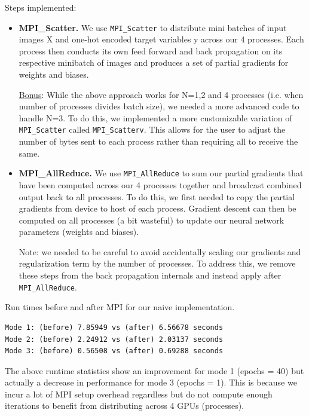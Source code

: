 \documentclass[12pt,letterpaper,twoside]{article}
\begin{document}
Steps implemented:
\begin{itemize}
    \item \textbf{MPI\_Scatter.} We use \texttt{MPI\_Scatter} to distribute mini batches
    of input images X and one-hot encoded target variables y across our 4 processes. 
    Each process then conducts its own feed forward and back propagation on its 
    respective minibatch of images and produces a set of partial gradients for 
    weights and biases.

    \underline{Bonus}: While the above approach works for N=1,2 and 4 processes (i.e. when
    number of processes divides batch size), we needed a more advanced code to handle N=3.
    To do this, we implemented a more customizable variation of \texttt{MPI\_Scatter} 
    called \texttt{MPI\_Scatterv}. This allows for the user to adjust the number of 
    bytes sent to each process rather than requiring all to receive the same.

    \item \textbf{MPI\_AllReduce.} We use \texttt{MPI\_AllReduce} to sum our partial 
    gradients that have been computed across our 4 processes together and broadcast 
    combined output back to all processes. To do this, we first needed to copy the 
    partial gradients from device to host of each process. Gradient descent can then 
    be computed on all processes (a bit wasteful) to update our neural network 
    parameters (weights and biases).

    Note: we needed to be careful to avoid accidentally scaling our gradients and 
    regularization term by the number of processes. To address this, we remove these 
    steps from the back propagation internals and instead apply after \texttt{MPI\_AllReduce}. 
\end{itemize}

Run times before and after MPI for our naive implementation.
\begin{verbatim}
Mode 1: (before) 7.85949 vs (after) 6.56678 seconds
Mode 2: (before) 2.24912 vs (after) 2.03137 seconds
Mode 3: (before) 0.56508 vs (after) 0.69288 seconds
\end{verbatim}

The above runtime statistics show an improvement for mode 1 (epochs = 40) but actually
a decrease in performance for mode 3 (epochs = 1). This is because we incur a lot of
MPI setup overhead regardless but do not compute enough iterations to benefit from 
distributing across 4 GPUs (processes).


\pagebreak
\end{document}
